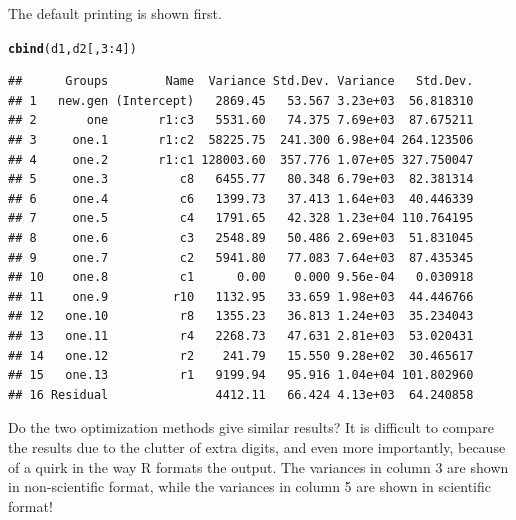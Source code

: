 \documentclass[12pt]{article}\usepackage[]{graphicx}\usepackage[]{color}
\makeatletter
\newcommand{\hlnum}[1]{\textcolor[rgb]{0.686,0.059,0.569}{#1}}%
\newcommand{\hlopt}[1]{\textcolor[rgb]{0,0,0}{#1}}%
\newcommand{\hlstd}[1]{\textcolor[rgb]{0.345,0.345,0.345}{#1}}%
\newcommand{\hlkwd}[1]{\textcolor[rgb]{0.737,0.353,0.396}{\textbf{#1}}}%
\newenvironment{kframe}{%
 \def\at@end@of@kframe{}%
 \ifinner\ifhmode%
  \def\at@end@of@kframe{\end{minipage}}%
  \begin{minipage}{\columnwidth}%
 \fi\fi%
 \def\FrameCommand##1{\hskip\@totalleftmargin \hskip-\fboxsep
 \colorbox{shadecolor}{##1}\hskip-\fboxsep
     \hskip-\linewidth \hskip-\@totalleftmargin \hskip\columnwidth}%
 \MakeFramed {\advance\hsize-\width
   \@totalleftmargin\z@ \linewidth\hsize
   \@setminipage}}%
 {\par\unskip\endMakeFramed%
 \at@end@of@kframe}
\newenvironment{knitrout}{}{} %
\makeatother
\begin{document}
The default printing is shown first.
\begin{knitrout}
\color{fgcolor}\begin{kframe}
\begin{alltt}
\hlkwd{cbind}\hlstd{(d1,d2[,}\hlnum{3}\hlopt{:}\hlnum{4}\hlstd{])}
\end{alltt}
\begin{verbatim}
##      Groups        Name  Variance Std.Dev. Variance   Std.Dev.
## 1   new.gen (Intercept)   2869.45   53.567 3.23e+03  56.818310
## 2       one       r1:c3   5531.60   74.375 7.69e+03  87.675211
## 3     one.1       r1:c2  58225.75  241.300 6.98e+04 264.123506
## 4     one.2       r1:c1 128003.60  357.776 1.07e+05 327.750047
## 5     one.3          c8   6455.77   80.348 6.79e+03  82.381314
## 6     one.4          c6   1399.73   37.413 1.64e+03  40.446339
## 7     one.5          c4   1791.65   42.328 1.23e+04 110.764195
## 8     one.6          c3   2548.89   50.486 2.69e+03  51.831045
## 9     one.7          c2   5941.80   77.083 7.64e+03  87.435345
## 10    one.8          c1      0.00    0.000 9.56e-04   0.030918
## 11    one.9         r10   1132.95   33.659 1.98e+03  44.446766
## 12   one.10          r8   1355.23   36.813 1.24e+03  35.234043
## 13   one.11          r4   2268.73   47.631 2.81e+03  53.020431
## 14   one.12          r2    241.79   15.550 9.28e+02  30.465617
## 15   one.13          r1   9199.94   95.916 1.04e+04 101.802960
## 16 Residual               4412.11   66.424 4.13e+03  64.240858
\end{verbatim}
\end{kframe}
\end{knitrout}
Do the two optimization methods give similar results?  It is difficult
to compare the results due to the clutter of extra digits, and even
more importantly, because of a quirk in the way R formats the output.
The variances in column 3 are shown in non-scientific format, while
the variances in column 5 are shown in scientific format!
\end{document}
